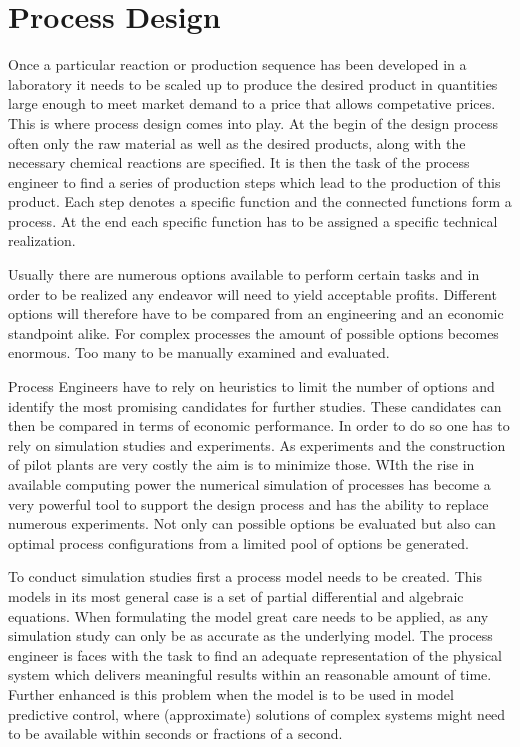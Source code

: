 \chapter{Process Design}
\label{chp:proces_design}

Once a particular reaction or production sequence has been developed in a laboratory it needs to be scaled 
up to produce the desired product in quantities large enough to meet market demand to a price that allows 
competative prices. This is where process design comes into play. At the begin of the design process often 
only the raw material as well as the desired products, along with the necessary chemical reactions are 
specified. It is then the task of the process engineer to find a series of production steps which lead to the 
production of this product. Each step denotes a specific function and the connected functions form a process.
 At the end each specific function has to be assigned a specific technical realization. 

Usually there are numerous options available to perform certain tasks and in order to be realized any 
endeavor will need to yield acceptable profits. Different options will therefore have to be compared  from an 
engineering and an economic standpoint alike. For complex processes the amount of possible options 
becomes enormous. Too many to be manually examined and evaluated. 

Process Engineers have to rely on heuristics to limit the number of options and identify the most promising 
candidates for further studies. These candidates can then be compared in terms of economic performance. 
In order to do so one has to rely on simulation studies and experiments. As experiments and the construction 
of pilot plants are very costly the aim is to minimize those. WIth the rise in available computing power the 
numerical simulation of processes has become a very powerful tool to support the design process and has 
the ability to replace numerous experiments. Not only can possible options be evaluated but also can 
optimal process configurations from a limited pool of options be generated. 

To conduct simulation studies first a process model needs to be created. This models in its most general 
case is a set of partial differential and algebraic equations. When formulating the model great care needs 
to be applied, as any simulation study can only be as accurate as the underlying model. The process 
engineer is faces with the task to find an adequate representation of the physical system which delivers 
meaningful results within an reasonable amount of time. Further enhanced is this problem when the model 
is to be used in model predictive control, where (approximate) solutions of complex systems might need to 
be available within seconds or fractions of a second. 

